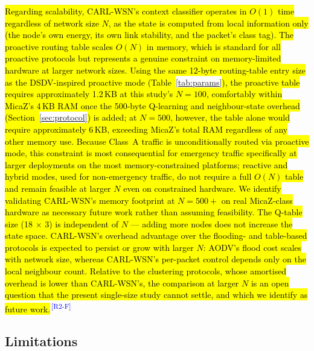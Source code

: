 \documentclass[12pt]{article}
\newcommand{\rtag}[1]{\textsuperscript{\textcolor{blue}{\scriptsize\,[#1]}}}
\newcommand{\hlx}[1]{{\exhyphenpenalty=10000\hyphenpenalty=10000\let\ \nobreakspace\hl{#1}}}
\begin{document}
\hlx{Regarding scalability, CARL-WSN's context classifier operates in
$O(1)$ time regardless of network size $N$, as the state is
computed from local information only (the node's own energy, its own link stability, and the packet's class tag). The proactive
routing table scales $O(N)$ in memory, which is standard for all
proactive protocols but represents a genuine constraint on
memory-limited hardware at larger network sizes. Using the same
12-byte routing-table entry size as the DSDV-inspired proactive
mode (Table~}\ref{tab:params}\hlx{), the proactive table requires
approximately 1.2\,KB at this study's $N = 100$, comfortably within
MicaZ's 4\,KB RAM once the 500-byte Q-learning and neighbour-state
overhead (Section~}\ref{sec:protocol}\hlx{) is added;
at $N = 500$, however, the table alone would require approximately
6\,KB, exceeding MicaZ's total RAM regardless of any other memory
use. Because Class~A traffic is unconditionally routed via proactive
mode, this constraint is most consequential for emergency traffic
specifically at larger deployments on the most memory-constrained
platforms; reactive and hybrid modes, used for non-emergency
traffic, do not require a full $O(N)$ table and remain feasible at
larger $N$ even on constrained hardware. We identify validating
CARL-WSN's memory footprint at $N = 500{+}$ on real MicaZ-class
hardware as necessary future work rather than assuming feasibility.
The Q-table size (18 $\times$ 3)
is independent of $N$ --- adding more nodes does not increase the
state space. CARL-WSN's overhead advantage over the flooding- and table-based
protocols is expected to persist or grow with larger $N$: AODV's
flood cost scales with network size, whereas CARL-WSN's per-packet
control depends only on the local neighbour count. Relative to the
clustering protocols, whose amortised overhead is lower than
CARL-WSN's, the comparison at larger $N$ is an open question that
the present single-size study cannot settle, and which we identify
as future work.}\rtag{R2-F}

\subsection{Limitations}
\end{document}
